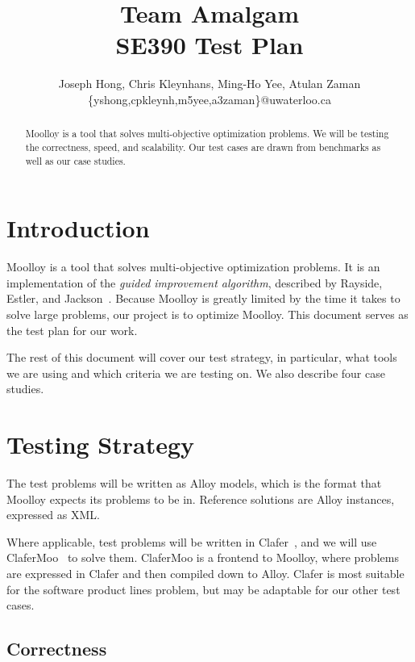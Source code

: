 \documentclass[11pt]{article}
\title{{\Large Team Amalgam} \\ SE390 Test Plan}
\author{Joseph Hong, Chris Kleynhans, Ming-Ho Yee, Atulan Zaman \\
        \{yshong,cpkleynh,m5yee,a3zaman\}@uwaterloo.ca}
\begin{document}
\maketitle

\begin{abstract}
Moolloy is a tool that solves multi-objective optimization problems.
We will be testing the correctness, speed, and scalability. Our test
cases are drawn from benchmarks as well as our case studies.
\end{abstract}

\tableofcontents
\newpage

\section{Introduction}

Moolloy is a tool that solves multi-objective optimization problems. It
is an implementation of the \textit{guided improvement algorithm},
described by Rayside, Estler, and Jackson~\cite{ref:Rayside09}. Because
Moolloy is greatly limited by the time it takes to solve large
problems, our project is to optimize Moolloy. This document serves as
the test plan for our work.

The rest of this document will cover our test strategy, in particular,
what tools we are using and which criteria we are testing on. We also
describe four case studies.

\section{Testing Strategy}

The test problems will be written as Alloy models, which is the format
that Moolloy expects its problems to be in. Reference solutions are
Alloy instances, expressed as XML.

Where applicable, test problems will be written in
Clafer~\cite{ref:Bak10}, and we will use
ClaferMoo~\cite{ref:Olaechea12} to solve them. ClaferMoo is a frontend
to Moolloy, where problems are expressed in Clafer and then compiled
down to Alloy. Clafer is most suitable for the software product lines
problem, but may be adaptable for our other test cases.

\subsection{Correctness}
\end{document}
